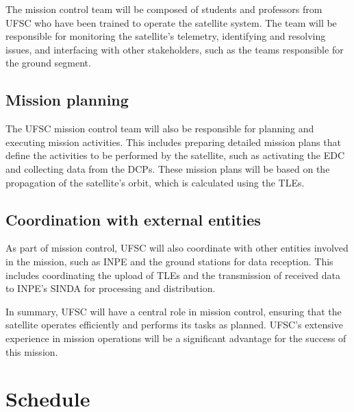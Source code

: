 The mission control team will be composed of students and professors from UFSC who have been trained to operate the satellite system. The team will be responsible for monitoring the satellite's telemetry, identifying and resolving issues, and interfacing with other stakeholders, such as the teams responsible for the ground segment.

\subsection{Mission planning}

The UFSC mission control team will also be responsible for planning and executing mission activities. This includes preparing detailed mission plans that define the activities to be performed by the satellite, such as activating the EDC and collecting data from the DCPs. These mission plans will be based on the propagation of the satellite's orbit, which is calculated using the TLEs.

\subsection{Coordination with external entities}

As part of mission control, UFSC will also coordinate with other entities involved in the mission, such as INPE and the ground stations for data reception. This includes coordinating the upload of TLEs and the transmission of received data to INPE's SINDA for processing and distribution.

In summary, UFSC will have a central role in mission control, ensuring that the satellite operates efficiently and performs its tasks as planned. UFSC's extensive experience in mission operations will be a significant advantage for the success of this mission.

\section{Schedule}

